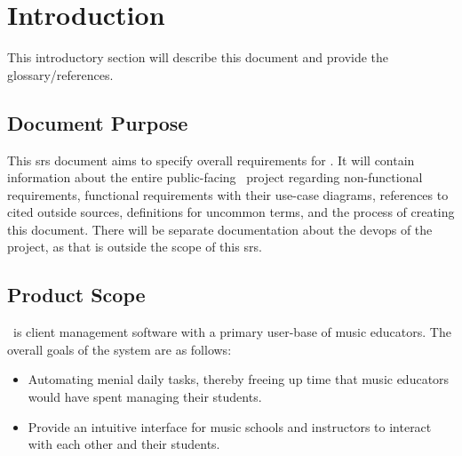 
\section{Introduction}\label{sec:introduction}
    This introductory section will describe this document and provide the glossary/references.
    \subsection{Document Purpose}\label{sec:document-purpose}
        This \gls{srs} document aims to specify overall requirements for \projectName. It will contain information about the entire public-facing \projectName\ project regarding non-functional requirements, functional requirements with their use-case diagrams, references to cited outside sources, definitions for uncommon terms, and the process of creating this document. There will be separate documentation about the \gls{devops} of the project, as that is outside the scope of this \gls{srs}.
    \subsection{Product Scope}\label{sec:product-scope}
        \projectName\ is client management software with a primary user-base of music educators. The overall goals of the system are as follows:
        \begin{itemize}
            \item Automating menial daily tasks, thereby freeing up time that music educators would have spent managing their students.
            \item Provide an intuitive interface for music schools and instructors to interact with each other and their students.
        \end{itemize}
